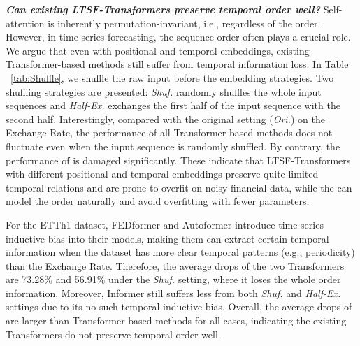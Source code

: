 \textbf{\emph{Can existing LTSF-Transformers preserve temporal order well?}}
Self-attention is inherently permutation-invariant, i.e., regardless of the order. However, in time-series forecasting, the sequence order often plays a crucial role. We argue that even with positional and temporal embeddings, existing Transformer-based methods still suffer from temporal information loss. In Table ~\ref{tab:Shuffle}, we shuffle the raw input before the embedding strategies. Two shuffling strategies are presented: \emph{Shuf.} randomly shuffles the whole input sequences and \emph{Half-Ex.} exchanges the first half of the input sequence with the second half.
%
Interestingly, compared with the original setting (\emph{Ori.}) on the Exchange Rate, the performance of all Transformer-based methods does not fluctuate even when the input sequence is randomly shuffled. By contrary, the performance of \modelname is damaged significantly. These indicate that LTSF-Transformers with different positional and temporal embeddings preserve quite limited temporal relations and are prone to overfit on noisy financial data, while the \modelname can model the order naturally and avoid overfitting with fewer parameters. 
%

For the ETTh1 dataset, FEDformer and Autoformer introduce time series inductive bias into their models, making them can extract certain temporal information when the dataset has more clear temporal patterns (e.g., periodicity) than the Exchange Rate. Therefore, the average drops of the two Transformers are 73.28\% and 56.91\% under the \emph{Shuf.} setting, where it loses the whole order information. Moreover, Informer still suffers less from both \emph{Shuf.} and \emph{Half-Ex.} settings due to its no such temporal inductive bias. Overall, the average drops of \modelname are larger than Transformer-based methods for all cases, indicating the existing Transformers do not preserve temporal order well.


%

